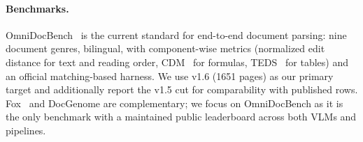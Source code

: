 \paragraph{Benchmarks.}
OmniDocBench~\cite{omnidocbench} is the current standard for end-to-end document parsing: nine document genres, bilingual, with component-wise metrics (normalized edit distance for text and reading order, CDM~\cite{cdm} for formulas, TEDS~\cite{teds} for tables) and an official matching-based harness. We use v1.6 (1651 pages) as our primary target and additionally report the v1.5 cut for comparability with published rows. Fox~\cite{fox} and DocGenome are complementary; we focus on OmniDocBench as it is the only benchmark with a maintained public leaderboard across both VLMs and pipelines.
